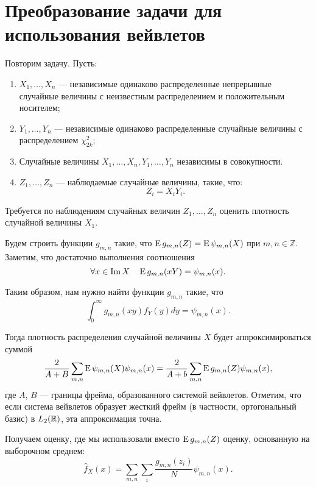 \documentclass[../paper.tex]{subfiles}
\begin{document}
\section{Преобразование задачи для использования вейвлетов}
Повторим задачу. Пусть:
\begin{enumerate}
	\item $X_1, \dots, X_n$ --- независимые одинаково распределенные непрерывные случайные величины
		с неизвестным распределением и положительным носителем; 
	\item $Y_1, \dots, Y_n$ --- независимые одинаково распределенные случайные величины с распределением $\chi^2_{2k}$;
	\item Случайные величины $X_1, \dots, X_n, Y_1, \dots, Y_n$ независимы в совокупности.
	\item $Z_1, \dots, Z_n$ --- наблюдаемые случайные величины, такие, что:
		\[
			Z_i = X_i Y_i
		.\]
\end{enumerate}
Требуется по наблюдениям случайных величин $Z_1, ..., Z_n$ оценить плотность случайной величины $X_1$.

Будем строить функции $g_{m,n}$ такие, что $\operatorname{E} g_{m,n}(Z) = \operatorname{E} \psi_{m,n}(X)$ при $m, n \in \mathbb{Z}$. Заметим, что достаточно выполнения соотношения
\[
    \forall x \in \operatorname{Im} X \quad \operatorname{E} g_{m,n} (xY) = \psi_{m,n}(x) 
.\]

Таким образом, нам нужно найти функции $g_{m,n}$ такие, что
\begin{equation}\label{eq:int-eq}
	\int_0^\infty g_{m,n}(xy) f_Y(y) dy = \psi_{m,n}(x)
.\end{equation}

Тогда плотность распределения случайной величины $X$ будет аппроксимироваться суммой
\begin{equation}\label{eq:reconstruction}
	\frac{2}{A+B} \sum_{m,n} \operatorname{E} \psi_{m,n}(X)\psi_{m,n}(x)
	= \frac{2}{A+b} \sum_{m,n} \operatorname{E} g_{m,n}(Z) \psi_{m,n}(x)
,\end{equation}
где $A$, $B$ --- границы фрейма, образованного системой вейвлетов.
Отметим, что если система вейвлетов образует жесткий фрейм (в частности, ортогональный базис) в $L_2(\mathbb{R})$, эта аппроксимация точна.

Получаем оценку, где мы использовали вместо $\operatorname{E} g_{m,n}(Z)$ оценку, основанную на выборочном среднем:
\begin{equation}\label{eq:estimation}
	\hat{f}_X(x) = \sum_{m,n} \sum_i \frac{g_{m,n}(z_i)}{N} \psi_{m,n}(x)
.\end{equation}
\end{document}
